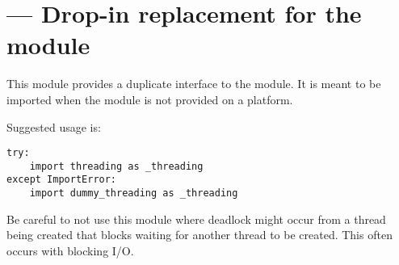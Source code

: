 \section{ ---
         Drop-in replacement for the  module}


This module provides a duplicate interface to the  module. It
is meant to be imported when the  module is not provided on a
platform.

Suggested usage is:

\begin{verbatim}
try:
    import threading as _threading
except ImportError:
    import dummy_threading as _threading
\end{verbatim}

Be careful to not use this module where deadlock might occur from a thread 
being created that blocks waiting for another thread to be created.  This 
often occurs with blocking I/O.
